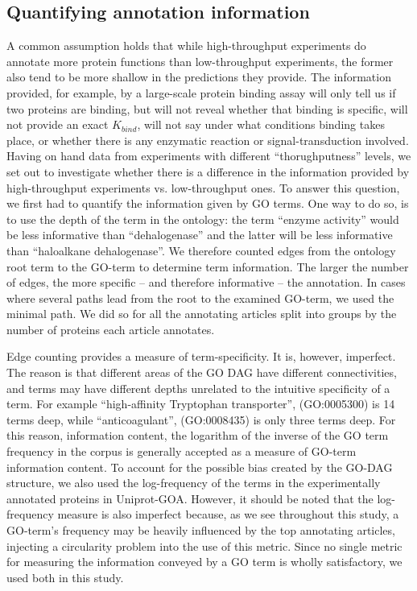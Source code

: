 \documentclass[12pt]{article}
\begin{document}
\subsection*{Quantifying annotation information}

A common assumption holds that while high-throughput experiments do annotate more protein
functions than low-throughput experiments, the former also tend to be more shallow in the
predictions they provide. The information provided, for example, by a large-scale protein
binding assay will only tell us if two proteins are binding, but will not reveal whether
that binding is specific, will not provide an exact $K_{bind}$, will not say under what
conditions binding takes place, or whether there is any enzymatic reaction or
signal-transduction involved. Having on hand data from experiments with different
``thorughputness'' levels,  we set out to investigate whether there is a difference in the
information provided by high-throughput experiments vs. low-throughput ones. To answer this
question, we first had to quantify the information given by GO terms. One way to do so, is
to use the depth of the term in the ontology: the term ``enzyme activity'' would be less
informative than ``dehalogenase'' and the latter will be less informative than ``haloalkane
dehalogenase''.  We therefore counted edges from the ontology root term to the GO-term to
determine term information. The larger the number of edges, the more specific -- and
therefore informative -- the annotation. In cases where several paths lead from the root to
the examined GO-term, we used the minimal path. We did so for all the annotating articles
split into groups by the number of proteins each article annotates. 

Edge counting provides a measure of term-specificity. It is, however, imperfect. The reason is
that different areas of the GO DAG have different connectivities, and terms may have different
depths unrelated to the intuitive specificity of a term. For example ``high-affinity Tryptophan
transporter'', (GO:0005300) is 14 terms deep, while ``anticoagulant'', (GO:0008435) is only three
terms deep.  For this reason, information content, the logarithm of the inverse of the GO term
frequency in the corpus is generally accepted as a measure of GO-term information
content\cite{lord-semsim}. To account for the possible bias created by the GO-DAG structure, we
also used the log-frequency of the terms in the experimentally annotated proteins in Uniprot-GOA.
However, it should be noted that the log-frequency measure is also imperfect because, as we see
throughout this study, a GO-term's frequency may be heavily influenced  by the top annotating
articles, injecting a circularity problem into the use of this metric. Since no
single metric for measuring the information conveyed by a GO term is wholly satisfactory, we used
both in this study.
\end{document}
